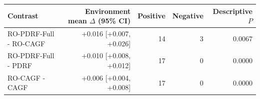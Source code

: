 \begin{tabular}{lrrrr}
\toprule
Contrast & Environment mean $\Delta$ (95\% CI) & Positive & Negative & Descriptive $P$ \\
\midrule
RO-PDRF-Full - RO-CAGF & +0.016 [+0.007, +0.026] & 14 & 3 & 0.0067 \\
RO-PDRF-Full - PDRF & +0.010 [+0.008, +0.012] & 17 & 0 & 0.0000 \\
RO-CAGF - CAGF & +0.006 [+0.004, +0.008] & 17 & 0 & 0.0000 \\
\bottomrule
\end{tabular}